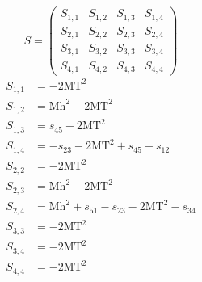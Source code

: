 \documentclass[a4paper]{article}
\begin{document}
\begin{equation}
S=\left(\begin{array}{cccc}
   S_{1,1}&
   S_{1,2}&
   S_{1,3}&
   S_{1,4}\\
   S_{2,1}&
   S_{2,2}&
   S_{2,3}&
   S_{2,4}\\
   S_{3,1}&
   S_{3,2}&
   S_{3,3}&
   S_{3,4}\\
   S_{4,1}&
   S_{4,2}&
   S_{4,3}&
   S_{4,4}\end{array}\right)
\end{equation}
\begin{subequations}
\begin{align}
   S_{1,1}&=-2\text{MT}^2\\
   S_{1,2}&=\text{Mh}^2-2\text{MT}^2\\
   S_{1,3}&=s_{45}-2\text{MT}^2\\
   S_{1,4}&=-s_{23}-2\text{MT}^2+s_{45}-s_{12}\\
   S_{2,2}&=-2\text{MT}^2\\
   S_{2,3}&=\text{Mh}^2-2\text{MT}^2\\
   S_{2,4}&=\text{Mh}^2+s_{51}-s_{23}-2\text{MT}^2-s_{34}\\
   S_{3,3}&=-2\text{MT}^2\\
   S_{3,4}&=-2\text{MT}^2\\
   S_{4,4}&=-2\text{MT}^2
\end{align}
\end{subequations}
\end{document}
